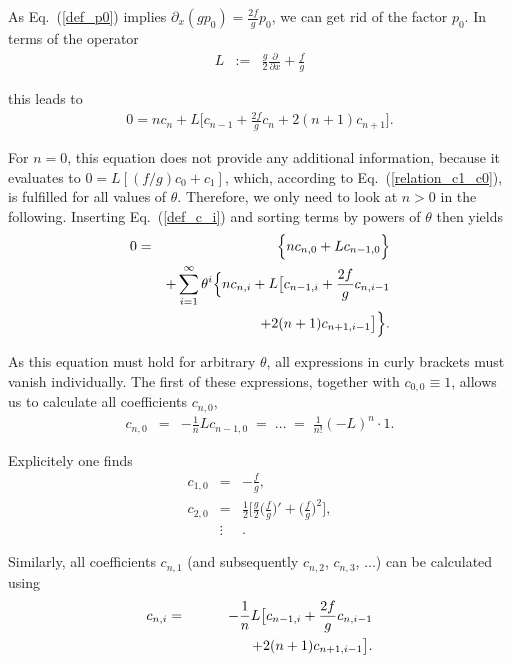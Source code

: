 \documentclass[aps,twocolumn,superscriptaddress,showpacs,showkeys]{revtex4}
\newcommand{\p}{\partial}
\begin{document}
{\noindent As Eq.~(\ref{def_p0}) implies $\p_x (gp_0) = \frac{2f}{g}p_0$, we can get rid of the factor $p_0$. In terms
of the operator
%
\begin{eqnarray}
L &:=& \frac{g}{2}\frac{\p}{\p x}+\frac{f}{g}
\end{eqnarray}

\noindent this leads to
%
\begin{eqnarray}
0 = nc_n+L\Big[c_{n-1} 
+ \frac{2f}{g}c_n +2(n+1)c_{n+1}\Big].
\end{eqnarray}

\noindent For $n=0$, this equation does not provide any additional information, because it evaluates to
$0=L[(f/g)c_0+c_1]$, which, according to Eq.~(\ref{relation_c1_c0}), is fulfilled for all values of $\theta$.
Therefore, we only need to look at $n>0$ in the following. Inserting Eq.~(\ref{def_c_i}) and sorting terms by powers of
$\theta$ then yields
%
\begin{eqnarray}
0 &=& \Big\{ nc_{n,0}+Lc_{n-1,0} \Big\}\cr
  && +\sum_{i=1}^\infty \theta^i \Big\{
nc_{n,i}+L\big[c_{n-1,i} +\frac{2f}{g}c_{n,i-1}\cr
&&\qquad\qquad +2(n+1)c_{n+1,i-1}\big]
\Big\}.
\end{eqnarray}

\noindent As this equation must hold for arbitrary $\theta$, all expressions in curly brackets must vanish individually.
The first of these expressions, together with $c_{0,0}\equiv 1$, allows us to calculate all coefficients $c_{n,0}$,
%
\begin{eqnarray}
c_{n,0} &=& -\frac{1}{n} L c_{n-1,0} \;=\; \ldots \;=\; \frac{1}{n!}(-L)^n\cdot 1.
\end{eqnarray}

\noindent Explicitely one finds
%
\begin{subequations}
\begin{eqnarray}
c_{1,0} &=& -\frac{f}{g},\\
c_{2,0} &=& \frac{1}{2}\Big[\frac{g}{2}\Big(\frac{f}{g}\Big)'+\Big(\frac{f}{g}\Big)^2\Big],\\
&\vdots&.\nonumber
\end{eqnarray}
\end{subequations}

\noindent Similarly, all coefficients $c_{n,1}$ (and subsequently $c_{n,2}$, $c_{n,3}$, $\ldots$) can be calculated using
%
\begin{eqnarray}
c_{n,i} &=& -\frac{1}{n} L\big[c_{n-1,i} +\frac{2f}{g}c_{n,i-1}\cr
&&\qquad\qquad +2(n+1)c_{n+1,i-1}\big].
\end{eqnarray}

}
\end{document}
